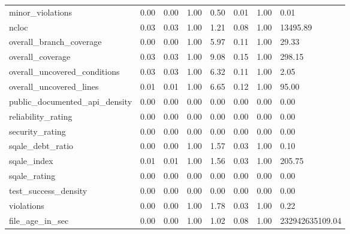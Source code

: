 \begin{landscape}
\begin{table}[!h]
\begin{tabular}{@{}llllllll@{}}
minor\_violations & 0.00 & 0.00 & 1.00 & 0.50 & 0.01 & 1.00 & 0.01 \\
ncloc & 0.03 & 0.03 & 1.00 & 1.21 & 0.08 & 1.00 & 13495.89 \\
overall\_branch\_coverage & 0.00 & 0.00 & 1.00 & 5.97 & 0.11 & 1.00 & 29.33 \\
overall\_coverage & 0.03 & 0.03 & 1.00 & 9.08 & 0.15 & 1.00 & 298.15 \\
overall\_uncovered\_conditions & 0.03 & 0.03 & 1.00 & 6.32 & 0.11 & 1.00 & 2.05 \\
overall\_uncovered\_lines & 0.01 & 0.01 & 1.00 & 6.65 & 0.12 & 1.00 & 95.00 \\
public\_documented\_api\_density & 0.00 & 0.00 & 0.00 & 0.00 & 0.00 & 0.00 & 0.00 \\
reliability\_rating & 0.00 & 0.00 & 0.00 & 0.00 & 0.00 & 0.00 & 0.00 \\
security\_rating & 0.00 & 0.00 & 0.00 & 0.00 & 0.00 & 0.00 & 0.00 \\
sqale\_debt\_ratio & 0.00 & 0.00 & 1.00 & 1.57 & 0.03 & 1.00 & 0.10 \\
sqale\_index & 0.01 & 0.01 & 1.00 & 1.56 & 0.03 & 1.00 & 205.75 \\
sqale\_rating & 0.00 & 0.00 & 0.00 & 0.00 & 0.00 & 0.00 & 0.00 \\
test\_success\_density & 0.00 & 0.00 & 0.00 & 0.00 & 0.00 & 0.00 & 0.00 \\
violations & 0.00 & 0.00 & 1.00 & 1.78 & 0.03 & 1.00 & 0.22 \\
file\_age\_in\_sec & 0.00 & 0.00 & 1.00 & 1.02 & 0.08 & 1.00 & 232942635109.04 \\ \bottomrule
\end{tabular}
\end{table}
\end{landscape}

